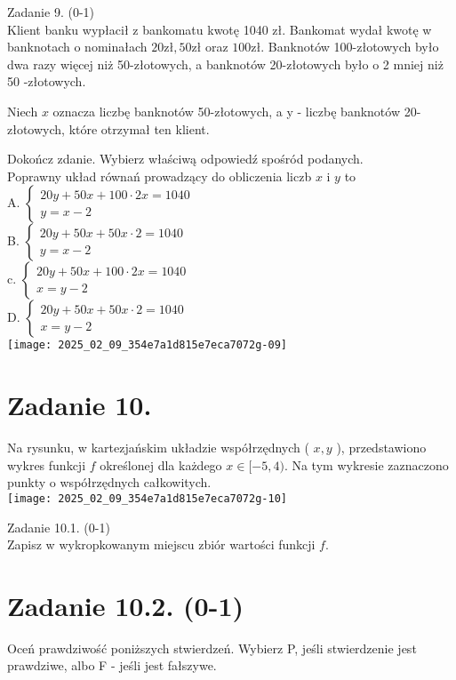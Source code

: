 \documentclass[10pt]{article}
\begin{document}
Zadanie 9. (0-1)\\
Klient banku wypłacił z bankomatu kwotę 1040 zł. Bankomat wydał kwotę w banknotach o nominałach \(20 \mathrm{zł}, 50 \mathrm{zł}\) oraz \(100 \mathrm{zł}\). Banknotów 100-złotowych było dwa razy więcej niż 50-złotowych, a banknotów 20-złotowych było o 2 mniej niż 50 -złotowych.

Niech \(x\) oznacza liczbę banknotów 50-złotowych, a y - liczbę banknotów 20-złotowych, które otrzymał ten klient.

Dokończ zdanie. Wybierz właściwą odpowiedź spośród podanych.\\
Poprawny układ równań prowadzący do obliczenia liczb \(x\) i \(y\) to\\
A. \(\left\{\begin{array}{l}20 y+50 x+100 \cdot 2 x=1040 \\ y=x-2\end{array}\right.\)\\
B. \(\left\{\begin{array}{l}20 y+50 x+50 x \cdot 2=1040 \\ y=x-2\end{array}\right.\)\\
c. \(\left\{\begin{array}{l}20 y+50 x+100 \cdot 2 x=1040 \\ x=y-2\end{array}\right.\)\\
D. \(\left\{\begin{array}{l}20 y+50 x+50 x \cdot 2=1040 \\ x=y-2\end{array}\right.\)\\
\texttt{[image: 2025\_02\_09\_354e7a1d815e7eca7072g-09]}

\section*{Zadanie 10.}
Na rysunku, w kartezjańskim układzie współrzędnych ( \(x, y\) ), przedstawiono wykres funkcji \(f\) określonej dla każdego \(x \in[-5,4)\). Na tym wykresie zaznaczono punkty o współrzędnych całkowitych.\\
\texttt{[image: 2025\_02\_09\_354e7a1d815e7eca7072g-10]}

Zadanie 10.1. (0-1)\\
Zapisz w wykropkowanym miejscu zbiór wartości funkcji \(f\).

\section*{Zadanie 10.2. (0-1)}
Oceń prawdziwość poniższych stwierdzeń. Wybierz P, jeśli stwierdzenie jest prawdziwe, albo F - jeśli jest fałszywe.
\end{document}
